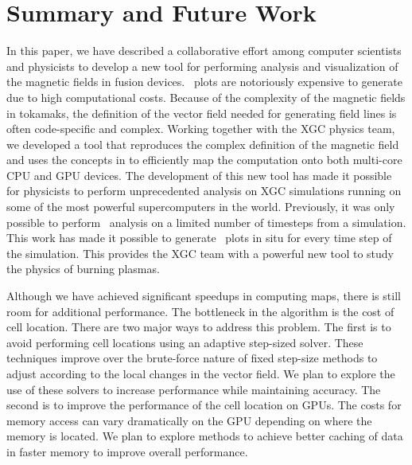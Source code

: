 \section{Summary and Future Work}
\label{sec:conclusion}
In this paper, we have described a collaborative effort among computer scientists and physicists to develop a new tool for performing analysis and visualization of the magnetic fields in fusion devices. \poincare\ plots are notoriously expensive to generate due to high computational costs. Because of the complexity of the magnetic fields in tokamaks, the definition of the vector field needed for generating field lines is often code-specific and complex. Working together with the XGC physics team, we developed a tool that reproduces the complex definition of the magnetic field and uses the concepts in \vtkm to efficiently map the computation onto both multi-core CPU and GPU devices.  The development of this new tool has made it possible for physicists to perform unprecedented analysis on XGC simulations running on some of the most powerful supercomputers in the world. Previously, it was only possible to perform \poincare\ analysis on a limited number of timesteps from a simulation. This work has made it possible to generate \poincare\ plots in situ for every time step of the simulation. This provides the XGC team with a powerful new tool to study the physics of burning plasmas.

Although we have achieved significant speedups in computing \poincare maps, there is still room for additional performance. The bottleneck in the algorithm is the cost of cell location. There are two major ways to address this problem. The first is to avoid performing cell locations using an adaptive step-sized solver. These techniques improve over the brute-force nature of fixed step-size methods to adjust according to the local changes in the vector field. We plan to explore the use of these solvers to increase performance while maintaining accuracy.
The second is to improve the performance of the cell location on GPUs. The costs for memory access can vary dramatically on the GPU depending on where the memory is located. We plan to explore methods to achieve better caching of data in faster memory to improve overall performance.


